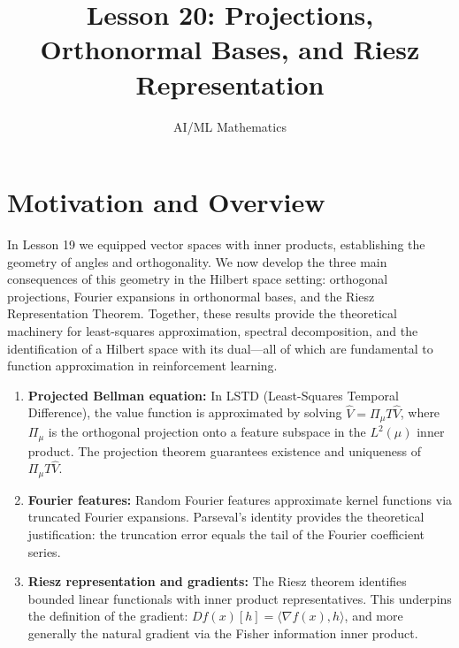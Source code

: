 \documentclass[11pt,a4paper]{article}
\title{Lesson 20: Projections, Orthonormal Bases, and Riesz Representation}
\author{AI/ML Mathematics}
\date{}
\begin{document}
\maketitle
\tableofcontents
\newpage


\section{Motivation and Overview}
\label{sec:motivation}

In Lesson 19 we equipped vector spaces with inner products, establishing
the geometry of angles and orthogonality. We now develop the three main
consequences of this geometry in the Hilbert space setting: orthogonal
projections, Fourier expansions in orthonormal bases, and the Riesz
Representation Theorem. Together, these results provide the theoretical
machinery for least-squares approximation, spectral decomposition, and
the identification of a Hilbert space with its dual---all of which are
fundamental to function approximation in reinforcement learning.

\begin{rlconnection}[title={Projections and Representation in RL}]
\begin{enumerate}[leftmargin=2em,nosep]
    \item \textbf{Projected Bellman equation:} In LSTD (Least-Squares
          Temporal Difference), the value function is approximated by
          solving $\hat{V} = \Pi_\mu T \hat{V}$, where $\Pi_\mu$ is the
          orthogonal projection onto a feature subspace in the $L^2(\mu)$
          inner product. The projection theorem guarantees existence and
          uniqueness of $\Pi_\mu T \hat{V}$.
    \item \textbf{Fourier features:} Random Fourier features approximate
          kernel functions via truncated Fourier expansions. Parseval's
          identity provides the theoretical justification: the truncation
          error equals the tail of the Fourier coefficient series.
    \item \textbf{Riesz representation and gradients:} The Riesz theorem
          identifies bounded linear functionals with inner product
          representatives. This underpins the definition of the gradient:
          $Df(x)[h] = \langle \nabla f(x), h \rangle$, and more generally
          the natural gradient via the Fisher information inner product.
\end{enumerate}
\end{rlconnection}
\end{document}
